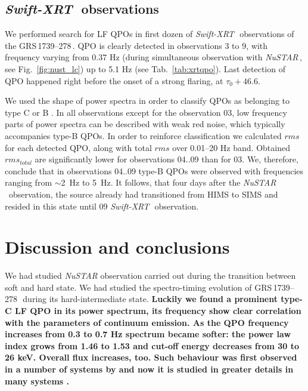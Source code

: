 \documentclass[a4paper,fleqn,usenatbib]{mnras}
\def\grs{{GRS\,1739--278\,}}
\def\swiftx{{\em Swift-XRT\,}}
\def\nustar{{\em NuSTAR\,}}
\begin{document}



\subsection{\swiftx\, observations}
We performed search for LF QPOs in first dozen of \swiftx\ observations of the \grs. 
QPO is clearly detected in observations 3 to 9, with frequency varying from 0.37 Hz (during simultaneous observation with \nustar, see Fig.~\ref{fig:nust_lc}) up to 5.1 Hz (see Tab.~\ref{tab:xrtqpo}). Last detection of QPO happened right before the onset of a strong flaring, at $\tau_{0}+46.6$. 

We used the shape of power spectra in order to classify QPOs as belonging to type C or B \citep{casella05}. 
In all observations except for the observation 03, low frequency parts of power spectra can be described with weak red noise, which typically accompanies type-B QPOs.
In order to reinforce classification we calculated $rms$ for each detected QPO, along with total $rms$ over 0.01--20 Hz band. 
Obtained $rms_{total}$ are significantly lower for observations 04..09 than for 03. 
We, therefore, conclude that in observations 04..09 type-B QPOs were observed with frequencies ranging from $\sim$2~Hz to 5~Hz.
It follows, that four days after the \nustar\ observation, the source already had transitioned from HIMS to SIMS and resided in this state until 09 \swiftx\ observation. 


\section{Discussion and conclusions}
We had studied {\it NuSTAR} observation carried out during the transition between soft and hard state. 
We had studied the spectro-timing evolution of \grs\, during its hard-intermediate state.  
{\bf 
Luckily we found a prominent type-C LF QPO in its power spectrum, its frequency show clear correlation with the parameters of continuum emission. 
As the QPO frequency increases from 0.3 to 0.7 Hz spectrum became softer: the power law index grows from 1.46 to 1.53 and cut-off energy decreases from 30 to 26 keV. 
Overall flux increases, too. 
Such behaviour was first observed in a number of systems by \citet{dimatteo99} and now it is studied in greater details in many systems \citep[see e.g.][ and many more]{vignarca03,stiele13,seifina14,fuerst16_gx339}. 
}
\end{document}
